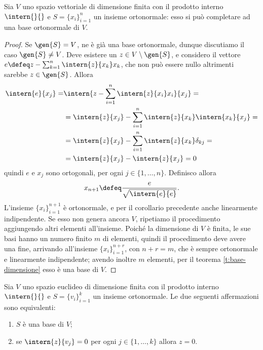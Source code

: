 \begin{teorema}
	Sia $V$ uno spazio vettoriale di dimensione finita con il prodotto interno $\intern{}{}$ e $S=\{  x_i\}_{i=1}^n$ un insieme ortonormale: esso si può completare ad una base ortonormale di $V$.
\end{teorema}
\begin{proof}
	Se $\gen{S}=V$, ne è già una base ortonormale, dunque discutiamo il caso $\gen{S}\neq V$. Deve esistere un $  z\in V\setminus\gen{S}$, e considero il vettore $  e\defeq  z-\sum_{k=1}^n\intern{  z}{  x_k}  x_k$, che non può essere nullo altrimenti sarebbe $  z\in\gen{S}$. Allora
	\begin{equation*}
		\begin{split}
			\intern{  e}{  x_j}=&\intern{  z-\sum_{i=1}^n\intern{  z}{  x_i}  x_i}{  x_j}=\\
				&=\intern{  z}{  x_j}-\sum_{i=1}^n\intern{  z}{  x_k}\intern{  x_k}{  x_j}=\\
				&=\intern{  z}{  x_j}-\sum_{i=1}^n\intern{  z}{  x_k}\delta_{kj}=\\
				&=\intern{  z}{  x_j}-\intern{  z}{  x_j}=0
		\end{split}
	\end{equation*}
	quindi $  e$ e $  x_j$ sono ortogonali, per ogni $j\in\{1,\dots,n\}$.
	Definisco allora
	\begin{equation*}
		  x_{n+1}\defeq \frac{  e}{\sqrt{\intern{  e}{  e}}}.
	\end{equation*}
	L'insieme $\{  x_i\}_{i=1}^{n+1}$ è ortonormale, e per il corollario precedente anche linearmente indipendente.
	Se esso non genera ancora $V$, ripetiamo il procedimento aggiungendo altri elementi all'insieme.
	Poiché la dimensione di $V$ è finita, le sue basi hanno un numero finito $m$ di elementi, quindi il procedimento deve avere una fine, arrivando all'insieme $\{  x_i\}_{i=1}^{n+r}$, con $n+r=m$, che è sempre ortonormale e linearmente indipendente; avendo inoltre $m$ elementi, per il teorema \ref{t:base-dimensione} esso è una base di $V$.
\end{proof}
\begin{teorema} \label{t:sistema-ortonormale-completo}
	Sia $V$ uno spazio euclideo di dimensione finita con il prodotto interno $\intern{}{}$ e $S=\{v_i\}_{i=1}^k$ un insieme ortonormale.
	Le due seguenti affermazioni sono equivalenti:
	\begin{enumerate}
		\item $S$ è una base di $V$;
		\item se $\intern{z}{v_j}=0$ per ogni $j\in\{1,\dots,k\}$ allora $z=0$.
	\end{enumerate}
\end{teorema}
